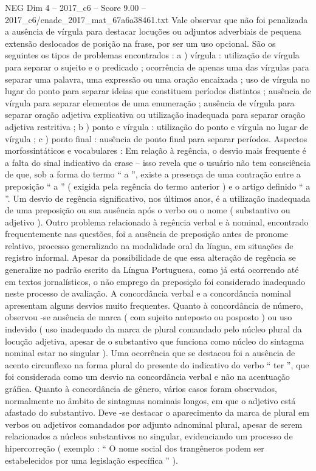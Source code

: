 \begin{textsample}{NEG Dim 4 – 2017\_c6 – Score 9.00 – 2017\_c6/enade\_2017\_mat\_67a6a38461.txt}
Vale observar que não foi penalizada a ausência de vírgula para destacar locuções ou adjuntos adverbiais de pequena extensão deslocados de posição na frase, por ser um uso opcional.
São os seguintes os tipos de problemas encontrados : a ) vírgula : utilização de vírgula para separar o sujeito e o predicado ; ocorrência de apenas uma das vírgulas para separar uma palavra, uma expressão ou uma oração encaixada ; uso de vírgula no lugar do ponto para separar ideias que constituem períodos distintos ; ausência de vírgula para separar elementos de uma enumeração ; ausência de vírgula para separar oração adjetiva explicativa ou utilização inadequada para separar oração adjetiva restritiva ; b ) ponto e vírgula : utilização do ponto e vírgula no lugar de vírgula ; c ) ponto final : ausência de ponto final para separar períodos.
Aspectos morfossintáticos e vocabulares : Em relação à regência, o desvio mais frequente é a falta do sinal indicativo da crase – isso revela que o usuário não tem consciência de que, sob a forma do termo “ a ”, existe a presença de uma contração entre a preposição “ a ” ( exigida pela regência do termo anterior ) e o artigo definido “ a ”.
Um desvio de regência significativo, nos últimos anos, é a utilização inadequada de uma preposição ou sua ausência após o verbo ou o nome ( substantivo ou adjetivo ).
Outro problema relacionado à regência verbal e à nominal, encontrado frequentemente nas questões, foi a ausência de preposição antes de pronome relativo, processo generalizado na modalidade oral da língua, em situações de registro informal.
Apesar da possibilidade de que essa alteração de regência se generalize no padrão escrito da Língua Portuguesa, como já está ocorrendo até em textos jornalísticos, o não emprego da preposição foi considerado inadequado neste processo de avaliação.
A concordância verbal e a concordância nominal apresentam alguns desvios muito frequentes.
Quanto à concordância de número, observou -se ausência de marca ( com sujeito anteposto ou posposto ) ou uso indevido ( uso inadequado da marca de plural comandado pelo núcleo plural da locução adjetiva, apesar de o substantivo que funciona como núcleo do sintagma nominal estar no singular ).
Uma ocorrência que se destacou foi a ausência de acento circunflexo na forma plural do presente do indicativo do verbo “ ter ”, que foi considerada como um desvio na concordância verbal e não na acentuação gráfica.
Quanto à concordância de gênero, vários casos foram observados, normalmente no âmbito de sintagmas nominais longos, em que o adjetivo está afastado do substantivo.
Deve -se destacar o aparecimento da marca de plural em verbos ou adjetivos comandados por adjunto adnominal plural, apesar de serem relacionados a núcleos substantivos no singular, evidenciando um processo de hipercorreção ( exemplo : “ O nome social dos trangêneros podem ser estabelecidos por uma legislação específica ” ).

\end{textsample}
